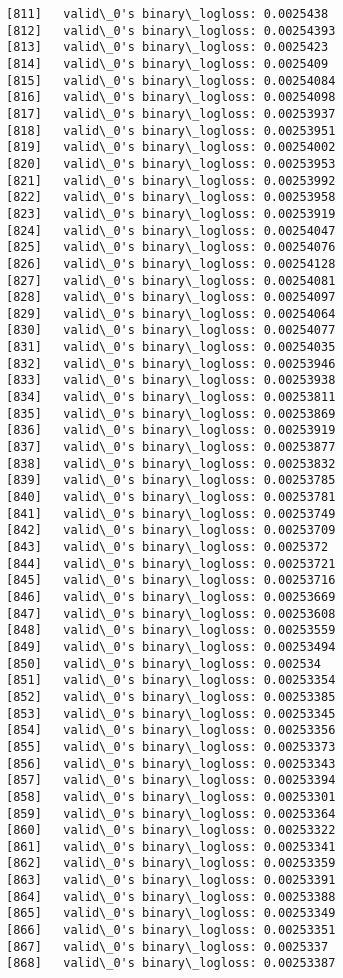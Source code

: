 \documentclass[11pt]{article}
\begin{document}
\begin{Verbatim}[commandchars=\\\{\}]
[811]	valid\_0's binary\_logloss: 0.0025438
[812]	valid\_0's binary\_logloss: 0.00254393
[813]	valid\_0's binary\_logloss: 0.0025423
[814]	valid\_0's binary\_logloss: 0.0025409
[815]	valid\_0's binary\_logloss: 0.00254084
[816]	valid\_0's binary\_logloss: 0.00254098
[817]	valid\_0's binary\_logloss: 0.00253937
[818]	valid\_0's binary\_logloss: 0.00253951
[819]	valid\_0's binary\_logloss: 0.00254002
[820]	valid\_0's binary\_logloss: 0.00253953
[821]	valid\_0's binary\_logloss: 0.00253992
[822]	valid\_0's binary\_logloss: 0.00253958
[823]	valid\_0's binary\_logloss: 0.00253919
[824]	valid\_0's binary\_logloss: 0.00254047
[825]	valid\_0's binary\_logloss: 0.00254076
[826]	valid\_0's binary\_logloss: 0.00254128
[827]	valid\_0's binary\_logloss: 0.00254081
[828]	valid\_0's binary\_logloss: 0.00254097
[829]	valid\_0's binary\_logloss: 0.00254064
[830]	valid\_0's binary\_logloss: 0.00254077
[831]	valid\_0's binary\_logloss: 0.00254035
[832]	valid\_0's binary\_logloss: 0.00253946
[833]	valid\_0's binary\_logloss: 0.00253938
[834]	valid\_0's binary\_logloss: 0.00253811
[835]	valid\_0's binary\_logloss: 0.00253869
[836]	valid\_0's binary\_logloss: 0.00253919
[837]	valid\_0's binary\_logloss: 0.00253877
[838]	valid\_0's binary\_logloss: 0.00253832
[839]	valid\_0's binary\_logloss: 0.00253785
[840]	valid\_0's binary\_logloss: 0.00253781
[841]	valid\_0's binary\_logloss: 0.00253749
[842]	valid\_0's binary\_logloss: 0.00253709
[843]	valid\_0's binary\_logloss: 0.0025372
[844]	valid\_0's binary\_logloss: 0.00253721
[845]	valid\_0's binary\_logloss: 0.00253716
[846]	valid\_0's binary\_logloss: 0.00253669
[847]	valid\_0's binary\_logloss: 0.00253608
[848]	valid\_0's binary\_logloss: 0.00253559
[849]	valid\_0's binary\_logloss: 0.00253494
[850]	valid\_0's binary\_logloss: 0.002534
[851]	valid\_0's binary\_logloss: 0.00253354
[852]	valid\_0's binary\_logloss: 0.00253385
[853]	valid\_0's binary\_logloss: 0.00253345
[854]	valid\_0's binary\_logloss: 0.00253356
[855]	valid\_0's binary\_logloss: 0.00253373
[856]	valid\_0's binary\_logloss: 0.00253343
[857]	valid\_0's binary\_logloss: 0.00253394
[858]	valid\_0's binary\_logloss: 0.00253301
[859]	valid\_0's binary\_logloss: 0.00253364
[860]	valid\_0's binary\_logloss: 0.00253322
[861]	valid\_0's binary\_logloss: 0.00253341
[862]	valid\_0's binary\_logloss: 0.00253359
[863]	valid\_0's binary\_logloss: 0.00253391
[864]	valid\_0's binary\_logloss: 0.00253388
[865]	valid\_0's binary\_logloss: 0.00253349
[866]	valid\_0's binary\_logloss: 0.00253351
[867]	valid\_0's binary\_logloss: 0.0025337
[868]	valid\_0's binary\_logloss: 0.00253387

\end{Verbatim}
\end{document}

